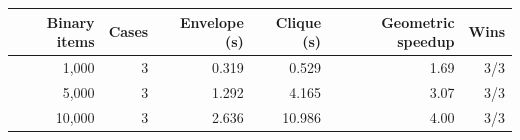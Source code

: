 \begin{tabular}{rrrrrr}
\toprule
Binary items & Cases & Envelope (s) & Clique (s) & Geometric speedup & Wins \\
\midrule
1,000 & 3 & 0.319 & 0.529 & 1.69 & 3/3 \\
5,000 & 3 & 1.292 & 4.165 & 3.07 & 3/3 \\
10,000 & 3 & 2.636 & 10.986 & 4.00 & 3/3 \\
\bottomrule
\end{tabular}
